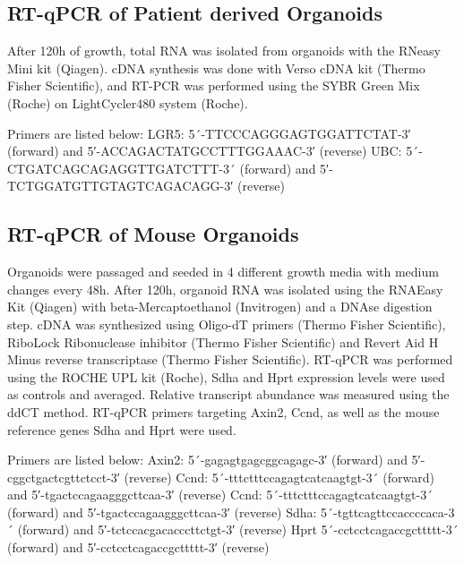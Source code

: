 \begin{flushleft}
\subsection{RT-qPCR of Patient derived Organoids}
After 120h of growth, total RNA was isolated from organoids with the RNeasy Mini kit (Qiagen). cDNA synthesis was done with Verso cDNA kit (Thermo Fisher Scientific), and RT-PCR was performed using the SYBR Green Mix (Roche) on LightCycler480 system (Roche). 

\smallbreak
Primers are listed below:
LGR5: 5´-TTCCCAGGGAGTGGATTCTAT-3′ (forward) and 5′-ACCAGACTATGCCTTTGGAAAC-3′ (reverse)
UBC: 5´-CTGATCAGCAGAGGTTGATCTTT-3´ (forward) and 5′-TCTGGATGTTGTAGTCAGACAGG-3′ (reverse)


\subsection{RT-qPCR of Mouse Organoids}
Organoids were passaged and seeded in 4 different growth media with medium changes every 48h. After 120h, organoid RNA was isolated using the RNAEasy Kit (Qiagen) with beta-Mercaptoethanol (Invitrogen) and a DNAse digestion step. cDNA was synthesized using Oligo-dT primers (Thermo Fisher Scientific), RiboLock Ribonuclease inhibitor (Thermo Fisher Scientific) and Revert Aid H Minus reverse transcriptase (Thermo Fisher Scientific). RT-qPCR was performed using the ROCHE UPL kit (Roche), Sdha and Hprt expression levels were used as controls and averaged. Relative transcript abundance was measured using the ddCT method. RT-qPCR primers targeting Axin2, Ccnd, as well as the mouse reference genes Sdha and Hprt were used. 

\smallbreak
Primers are listed below:
Axin2: 5´-gagagtgagcggcagagc-3′ (forward) and 5′-cggctgactcgttctcct-3′ (reverse)
Ccnd: 5´-tttctttccagagtcatcaagtgt-3´ (forward) and 5′-tgactccagaagggcttcaa-3′ (reverse)
Ccnd: 5´-tttctttccagagtcatcaagtgt-3´ (forward) and 5′-tgactccagaagggcttcaa-3′ (reverse)
Sdha: 5´-tgttcagttccaccccaca-3´ (forward) and 5′-tctccacgacacccttctgt-3′ (reverse)
Hprt 5´-cctcctcagaccgcttttt-3´ (forward) and 5′-cctcctcagaccgcttttt-3′ (reverse)
 



\end{flushleft}
